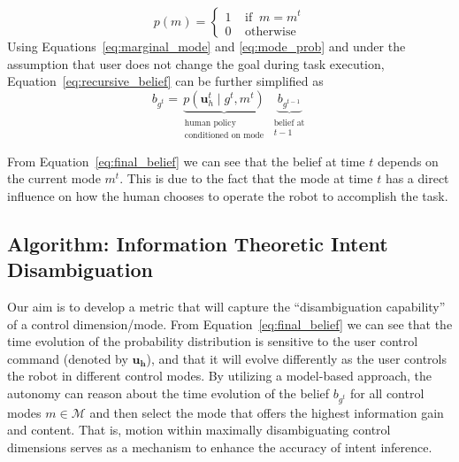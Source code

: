 \documentclass[conference]{IEEEtran}
\begin{document}
\begin{equation}\label{eq:mode_prob}
	p(m) = \begin{cases}
			1 \;\;\;\; \text{if} \;\; m = m^t \\
			0 \;\;\;\; \text{otherwise}
			\end{cases}
\end{equation}
Using Equations~\ref{eq:marginal_mode} and \ref{eq:mode_prob} and under the assumption that user does not change the goal during task execution, Equation~\ref{eq:recursive_belief} can be further simplified as 
\begin{equation}\label{eq:final_belief}
	b_{g^t} = \underbrace{p(\boldsymbol{u}_h^t \;|\; g^t, m^t )}_{\substack{\text{human policy} \\ \text{conditioned on mode}}}\;\underbrace{b_{g^{t-1}}}_{\substack{\text{belief at}\\ \text{$t-1$}}}
\end{equation}

From Equation~\ref{eq:final_belief} we can see that the belief at time $t$ depends on the current mode $m^t$. This is due to the fact that the mode at time $t$ has a direct influence on how the human chooses to operate the robot to accomplish the task. 

\subsection{Algorithm: Information Theoretic Intent Disambiguation}

Our aim is to develop a metric that will capture the ``disambiguation capability'' of a control dimension/mode. 
From Equation~\ref{eq:final_belief} we can see that the time evolution of the probability distribution is sensitive to the user control command (denoted by $\boldsymbol{u_h}$), and that it will evolve differently as the user controls the robot in different control modes. By utilizing a model-based approach, the autonomy can reason about the time evolution of the belief $b_{g^t}$ for all control modes $m \in \mathcal{M}$ and then select the mode that offers the highest information gain and content. That is, motion within maximally disambiguating control dimensions serves as a mechanism to enhance the accuracy of intent inference. 
\end{document}

